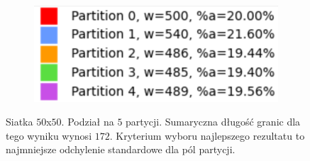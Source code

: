 \begin{figure}[h]
\begin{subfigure}{.33\textwidth}
    \caption[short]{}
\end{subfigure}%
\begin{subfigure}{.33\textwidth}
    \centering
    \includegraphics[width=0.9\linewidth]{images/results/m_k/with/6/results}
    \caption[short]{}
\end{subfigure}
\caption{Siatka $50$x$50$. Podział na $5$ partycji. Sumaryczna długość granic dla tego wyniku wynosi $172$.
Kryterium wyboru najlepszego rezultatu to najmniejsze odchylenie standardowe dla pól partycji.}
\label{result:6}
\end{figure}
